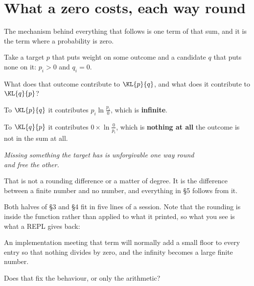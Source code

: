 \section{What a zero costs, each way round}
\label{sec:P30-zero}

\begin{fr}
The mechanism behind everything that follows is one term of that sum, and it
is the term where a probability is zero.

Take a target $p$ that puts weight on some outcome and a candidate $q$ that
puts none on it: $p_i > 0$ and $q_i = 0$.

What does that outcome contribute to $\KL{p}{q}$, and what does it contribute
to $\KL{q}{p}$?
\dotline
\nextframe
\end{fr}

\begin{fr}
\begin{ansblock}
To $\KL{p}{q}$ it contributes $p_i \ln \frac{p_i}{0}$, which is
\textbf{infinite}.

To $\KL{q}{p}$ it contributes $0 \times \ln \frac{0}{p_i}$, which is
\textbf{nothing at all} \dash{} the outcome is not in the sum at all.
\end{ansblock}

\begin{center}
\emph{Missing something the target has is unforgivable one way round\\
and free the other.}
\end{center}

That is not a rounding difference or a matter of degree. It is the difference
between a finite number and no number, and everything in §5 follows from it.

Both halves of §3 and §4 fit in five lines of a session. Note that the
rounding is inside the function rather than applied to what it printed, so
what you see is what a REPL gives back:


\end{fr}

\begin{fr}
An implementation meeting that term will normally add a small floor to every
entry so that nothing divides by zero, and the infinity becomes a large
finite number.

Does that fix the behaviour, or only the arithmetic?
\dotline
\nextframe
\end{fr}

